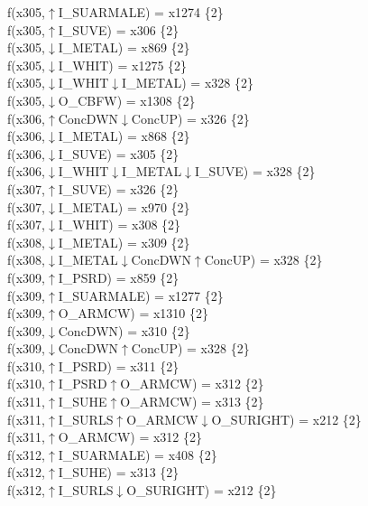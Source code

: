 f(x305,$\uparrow$I\_SUARMALE) = x1274 \{2\} \\  
f(x305,$\uparrow$I\_SUVE) = x306 \{2\} \\  
f(x305,$\downarrow$I\_METAL) = x869 \{2\} \\  
f(x305,$\downarrow$I\_WHIT) = x1275 \{2\} \\  
f(x305,$\downarrow$I\_WHIT$\downarrow$I\_METAL) = x328 \{2\} \\  
f(x305,$\downarrow$O\_CBFW) = x1308 \{2\} \\  
f(x306,$\uparrow$ConcDWN$\downarrow$ConcUP) = x326 \{2\} \\  
f(x306,$\downarrow$I\_METAL) = x868 \{2\} \\  
f(x306,$\downarrow$I\_SUVE) = x305 \{2\} \\  
f(x306,$\downarrow$I\_WHIT$\downarrow$I\_METAL$\downarrow$I\_SUVE) = x328 \{2\} \\  
f(x307,$\uparrow$I\_SUVE) = x326 \{2\} \\  
f(x307,$\downarrow$I\_METAL) = x970 \{2\} \\  
f(x307,$\downarrow$I\_WHIT) = x308 \{2\} \\  
f(x308,$\downarrow$I\_METAL) = x309 \{2\} \\  
f(x308,$\downarrow$I\_METAL$\downarrow$ConcDWN$\uparrow$ConcUP) = x328 \{2\} \\  
f(x309,$\uparrow$I\_PSRD) = x859 \{2\} \\  
f(x309,$\uparrow$I\_SUARMALE) = x1277 \{2\} \\  
f(x309,$\uparrow$O\_ARMCW) = x1310 \{2\} \\  
f(x309,$\downarrow$ConcDWN) = x310 \{2\} \\  
f(x309,$\downarrow$ConcDWN$\uparrow$ConcUP) = x328 \{2\} \\  
f(x310,$\uparrow$I\_PSRD) = x311 \{2\} \\  
f(x310,$\uparrow$I\_PSRD$\uparrow$O\_ARMCW) = x312 \{2\} \\  
f(x311,$\uparrow$I\_SUHE$\uparrow$O\_ARMCW) = x313 \{2\} \\  
f(x311,$\uparrow$I\_SURLS$\uparrow$O\_ARMCW$\downarrow$O\_SURIGHT) = x212 \{2\} \\  
f(x311,$\uparrow$O\_ARMCW) = x312 \{2\} \\  
f(x312,$\uparrow$I\_SUARMALE) = x408 \{2\} \\  
f(x312,$\uparrow$I\_SUHE) = x313 \{2\} \\  
f(x312,$\uparrow$I\_SURLS$\downarrow$O\_SURIGHT) = x212 \{2\} \\  
